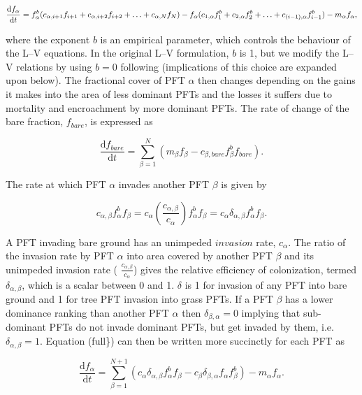 \[ \frac{\mathrm{d}f_\alpha}{\mathrm{d}t} = f^b_\alpha(c_{\alpha, i+1}f_{i+1} +c_{\alpha, i+2}f_{i+2} +\ldots+c_{\alpha,N}f_{N})\nonumber\\ - f_\alpha(c_{1,\alpha}f^b_1 + c_{2,\alpha}f^b_2 + \ldots + c_{(i-1), \alpha}f^b_{i-1})\nonumber\\ - m_{\alpha} f_\alpha,\label{full} \]

where the exponent $b$ is an empirical parameter, which controls the behaviour of the L--V equations. In the original L--V formulation, $b$ is 1, but we modify the L--V relations by using $b = 0$ following \cite{Arora2006-pp} \cite{Arora2006-ax} (implications of this choice are expanded upon below). The fractional cover of P\+F\+T $\alpha$ then changes depending on the gains it makes into the area of less dominant P\+F\+Ts and the losses it suffers due to mortality and encroachment by more dominant P\+F\+Ts. The rate of change of the bare fraction, $f_{bare}$, is expressed as

\[ \label{barecol} \frac{\mathrm{d}f_{bare}}{\mathrm{d}t} = \sum_{\beta=1}^{N} (m_\beta f_\beta - c_{\beta, {bare}}f^b_\beta f_{bare}). \]

The rate at which P\+F\+T $\alpha$ invades another P\+F\+T $\beta$ is given by

\[ \label{coloniz} c_{\alpha,\beta}f^b_\alpha f_{\beta} = c_\alpha \left(\frac{c_{\alpha,\beta}}{c_\alpha} \right)f^b_\alpha f_{\beta} = c_\alpha \delta_{\alpha,\beta} f^b_\alpha f_{\beta}. \]

A P\+F\+T invading bare ground has an unimpeded $\textit{invasion}$ rate, $c_\alpha$. The ratio of the invasion rate by P\+F\+T $\alpha$ into area covered by another P\+F\+T $\beta$ and its unimpeded invasion rate ( $\frac{c_{\alpha,\beta}}{c_\alpha}$) gives the relative efficiency of colonization, termed $\delta_{\alpha,\beta}$, which is a scalar between 0 and 1. $\delta$ is 1 for invasion of any P\+F\+T into bare ground and 1 for tree P\+F\+T invasion into grass P\+F\+Ts. If a P\+F\+T $\beta$ has a lower dominance ranking than another P\+F\+T $\alpha$ then $\delta_{\beta,\alpha} =0$ implying that sub-\/dominant P\+F\+Ts do not invade dominant P\+F\+Ts, but get invaded by them, i.\+e. $\delta_{\alpha,\beta}=1$. Equation (full\}) can then be written more succinctly for each P\+F\+T as

\[ \label{compact} \frac{\mathrm{d}f_\alpha}{\mathrm{d}t} = \sum_{\beta=1}^{N+1} (c_{\alpha} \delta_{\alpha,\beta}f^b_\alpha f_\beta - c_{\beta} \delta_{\beta,\alpha} f_\alpha f^b_\beta) - m_{\alpha} f_\alpha. \]

